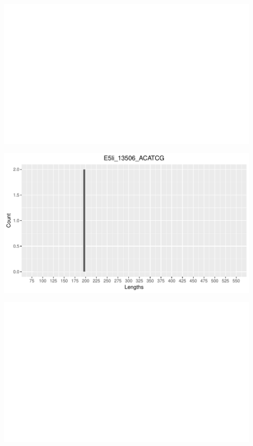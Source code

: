 \documentclass[12pt, a4paper]{article}\usepackage[]{graphicx}\usepackage[]{color}
\makeatletter
\def\maxwidth{ %
  \ifdim\Gin@nat@width>\linewidth
    \linewidth
  \else
    \Gin@nat@width
  \fi
}
\newenvironment{kframe}{%
 \def\at@end@of@kframe{}%
 \ifinner\ifhmode%
  \def\at@end@of@kframe{\end{minipage}}%
  \begin{minipage}{\columnwidth}%
 \fi\fi%
 \def\FrameCommand##1{\hskip\@totalleftmargin \hskip-\fboxsep
 \colorbox{shadecolor}{##1}\hskip-\fboxsep
     \hskip-\linewidth \hskip-\@totalleftmargin \hskip\columnwidth}%
 \MakeFramed {\advance\hsize-\width
   \@totalleftmargin\z@ \linewidth\hsize
   \@setminipage}}%
 {\par\unskip\endMakeFramed%
 \at@end@of@kframe}
\newenvironment{knitrout}{}{} %
\makeatother
\begin{document}
\begin{knitrout}
\includegraphics[width=\maxwidth]{figure/unnamed-chunk-4-26} 
\begin{kframe}

{\ttfamily\noindent\color{warningcolor}{\#\# Warning: Removed 1 rows containing missing values (geom\_bar).}}\end{kframe}
\includegraphics[width=\maxwidth]{figure/unnamed-chunk-4-27} 

\includegraphics[width=\maxwidth]{figure/unnamed-chunk-4-28} 
\begin{kframe}


\end{kframe}
\end{knitrout}
\end{document}
